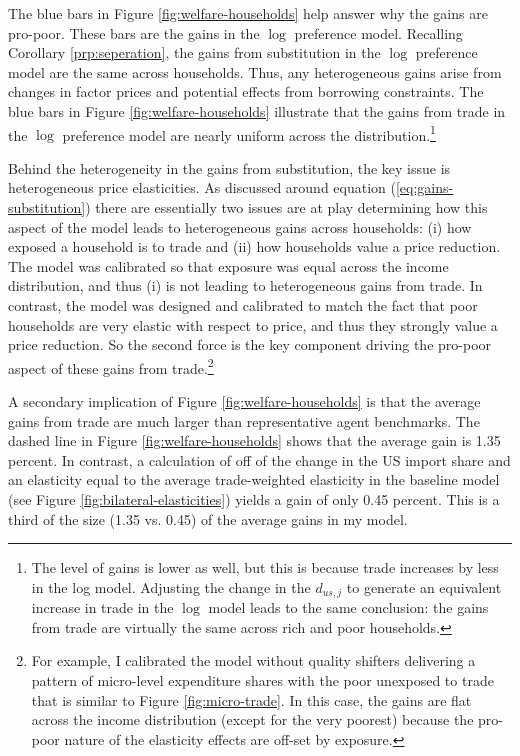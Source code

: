 \documentclass[12pt,pdftex]{article}
\begin{document}
\begin{onehalfspacing}
The blue bars in Figure \ref{fig:welfare-households} help answer why the gains are pro-poor. These bars are the gains in the $\log$ preference model. Recalling Corollary \ref{prp:seperation}, the gains from substitution in the $\log$ preference model are the same across households. Thus, any heterogeneous gains arise from changes in factor prices and potential effects from borrowing constraints. The blue bars in Figure \ref{fig:welfare-households} illustrate that the gains from trade in the $\log$ preference model are nearly uniform across the distribution.\footnote{The level of gains is lower as well, but this is because trade increases by less in the log model. Adjusting the change in the $d_{us,j}$ to generate an equivalent increase in trade in the $\log$ model leads to the same conclusion: the gains from trade are virtually the same across rich and poor households.}

Behind the heterogeneity in the gains from substitution, the key issue is heterogeneous price elasticities. As discussed around equation (\ref{eq:gains-substitution}) there are essentially two issues are at play determining how this aspect of the model leads to heterogeneous gains across households: (i) how exposed a household is to trade and (ii) how households value a price reduction. The model was calibrated so that exposure was equal across the income distribution, and thus (i) is not leading to heterogeneous gains from trade.  In contrast, the model was designed and calibrated to match the fact that poor households are very elastic with respect to price, and thus they strongly value a price reduction. So the second force is the key component driving the pro-poor aspect of these gains from trade.\footnote{For example, I calibrated the model without quality shifters delivering a pattern of micro-level expenditure shares with the poor unexposed to trade that is similar to Figure \ref{fig:micro-trade}. In this case, the gains are flat across the income distribution (except for the very poorest) because the pro-poor nature of the elasticity effects are off-set by exposure.}

A secondary implication of Figure \ref{fig:welfare-households} is that the average gains from trade are much larger than representative agent benchmarks. The dashed line in Figure \ref{fig:welfare-households} shows that the average gain is 1.35 percent. In contrast, a calculation of \citet{arkolakis2012new} off of the change in the US import share and an elasticity equal to the average trade-weighted elasticity in the baseline model (see Figure \ref{fig:bilateral-elasticities}) yields a gain of only 0.45 percent. This is a third of the size (1.35 vs. 0.45) of the average gains in my model.


\end{onehalfspacing}
\end{document}
